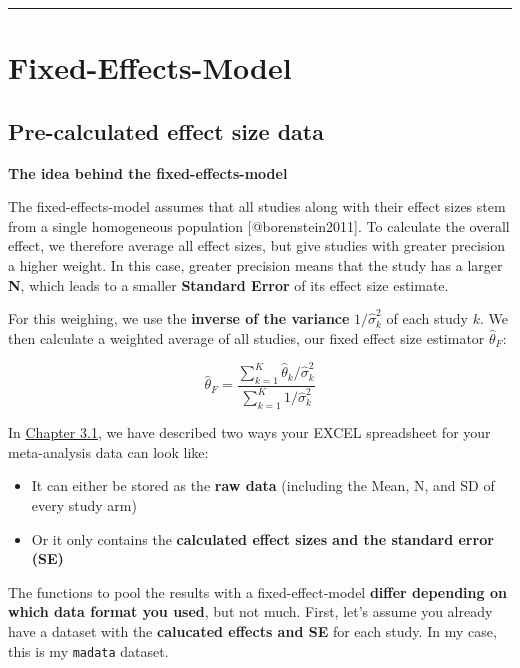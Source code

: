 \documentclass[]{book}
\providecommand{\tightlist}{%
  \setlength{\itemsep}{0pt}\setlength{\parskip}{0pt}}
\begin{document}
\begin{center}\rule{0.5\linewidth}{\linethickness}\end{center}

\hypertarget{fixed}{%
\section{Fixed-Effects-Model}\label{fixed}}

\hypertarget{pre.calc}{%
\subsection{Pre-calculated effect size data}\label{pre.calc}}

\begin{rmdinfo}
\textbf{The idea behind the fixed-effects-model}

The fixed-effects-model assumes that all studies along with their effect
sizes stem from a single homogeneous population {[}@borenstein2011{]}.
To calculate the overall effect, we therefore average all effect sizes,
but give studies with greater precision a higher weight. In this case,
greater precision means that the study has a larger \textbf{N}, which
leads to a smaller \textbf{Standard Error} of its effect size estimate.

For this weighing, we use the \textbf{inverse of the variance}
\(1/\hat\sigma^2_k\) of each study \(k\). We then calculate a weighted
average of all studies, our fixed effect size estimator
\(\hat\theta_F\):
\end{rmdinfo}

\begin{equation}
\hat\theta_F = \frac{\sum\limits_{k=1}^K \hat\theta_k/ \hat\sigma^2_k}{\sum\limits_{k=1}^K 1/\hat\sigma^2_k}
\end{equation}

In \protect\hyperlink{excel_preparation}{Chapter 3.1}, we have described two ways your EXCEL spreadsheet for your meta-analysis data can look like:

\begin{itemize}
\tightlist
\item
  It can either be stored as the \textbf{raw data} (including the Mean, N, and SD of every study arm)
\item
  Or it only contains the \textbf{calculated effect sizes and the standard error (SE)}
\end{itemize}

The functions to pool the results with a fixed-effect-model \textbf{differ depending on which data format you used}, but not much. First, let's assume you already have a dataset with the \textbf{calucated effects and SE} for each study. In my case, this is my \texttt{madata} dataset.
\end{document}
